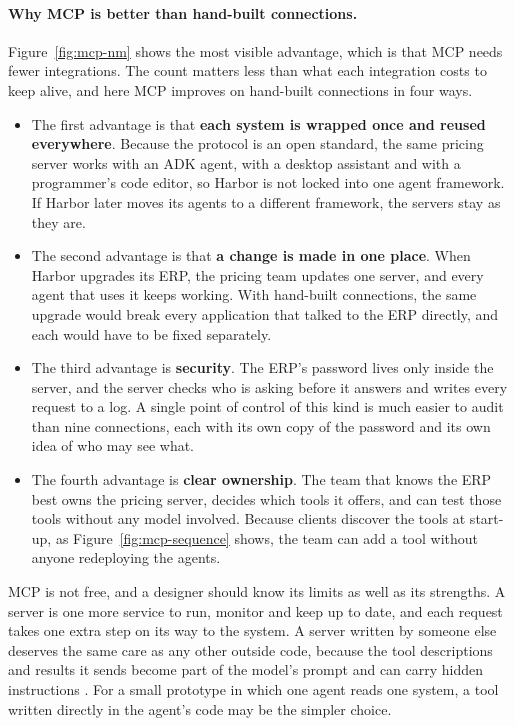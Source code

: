 \paragraph{Why MCP is better than hand-built connections.} Figure~\ref{fig:mcp-nm} shows the most visible advantage, which is that MCP needs fewer integrations. The count matters less than what each integration costs to keep alive, and here MCP improves on hand-built connections in four ways. 
\begin{itemize}
\item The first advantage is that \textbf{each system is wrapped once and reused everywhere}. Because the protocol is an open standard, the same pricing server works with an ADK agent, with a desktop assistant and with a programmer's code editor, so Harbor is not locked into one agent framework. If Harbor later moves its agents to a different framework, the servers stay as they are. 
\item The second advantage is that \textbf{a change is made in one place}. When Harbor upgrades its ERP, the pricing team updates one server, and every agent that uses it keeps working. With hand-built connections, the same upgrade would break every application that talked to the ERP directly, and each would have to be fixed separately. 
\item The third advantage is \textbf{security}. The ERP's password lives only inside the server, and the server checks who is asking before it answers and writes every request to a log. A single point of control of this kind is much easier to audit than nine connections, each with its own copy of the password and its own idea of who may see what. 
\item The fourth advantage is \textbf{clear ownership}. The team that knows the ERP best owns the pricing server, decides which tools it offers, and can test those tools without any model involved. Because clients discover the tools at start-up, as Figure~\ref{fig:mcp-sequence} shows, the team can add a tool without anyone redeploying the agents.
\end{itemize}

MCP is not free, and a designer should know its limits as well as its strengths. A server is one more service to run, monitor and keep up to date, and each request takes one extra step on its way to the system. A server written by someone else deserves the same care as any other outside code, because the tool descriptions and results it sends become part of the model's prompt and can carry hidden instructions \citep{greshake2023injection}. For a small prototype in which one agent reads one system, a tool written directly in the agent's code may be the simpler choice. 

